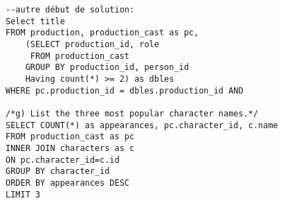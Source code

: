 \documentclass{article}
\begin{document}
\begin{lstlisting}
--autre début de solution:
Select title
FROM production, production_cast as pc,
	(SELECT production_id, role
     FROM production_cast
    GROUP BY production_id, person_id
    Having count(*) >= 2) as dbles
WHERE pc.production_id = dbles.production_id AND

/*g) List the three most popular character names.*/
SELECT COUNT(*) as appearances, pc.character_id, c.name
FROM production_cast as pc
INNER JOIN characters as c
ON pc.character_id=c.id
GROUP BY character_id
ORDER BY appearances DESC
LIMIT 3
\end{lstlisting}

\vspace{3mm}
\end{document}
